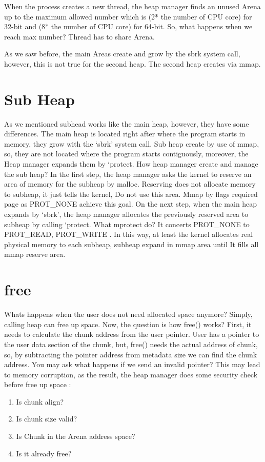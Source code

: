 \documentclass{masterthesis}
\begin{document}
When the process creates a new thread, the heap manager finds an unused Arena up to the maximum allowed number which is (2* the number of CPU core) for 32-bit and (8* the number of CPU core) for 64-bit. So, what happens when we reach max number? Thread has to share Arena.

As we saw before, the main Areas create and grow by the sbrk system call, however, this is not true for the second heap. The second heap creates via mmap.

\section{Sub Heap}
As we mentioned subhead works like the main heap, however, they have some differences. The main heap is located right after where the program starts in memory, they grow with the ‘sbrk’ system call. Sub heap create by use of mmap, so, they are not located where the program starts contiguously, moreover, the Heap manager expands them by ‘protect.
How heap manager create and manage the sub heap? In the first step, the heap manager asks the kernel to reserve an area of memory for the subheap by malloc. Reserving does not allocate memory to subheap, it just tells the kernel, Do not use this area. Mmap by flags required page as PROT\_NONE achieve this goal.
On the next step, when the main heap expands by ‘sbrk’, the heap manager allocates the previously reserved area to subheap by calling ‘protect. What mprotect do? It concerts PROT\_NONE to PROT\_READ, PROT\_WRITE . In this way, at least the kernel allocates real physical memory to each subheap, subheap expand in mmap area until It fills all mmap reserve area.

\section{free}
Whats happens when the user does not need allocated space anymore? Simply, calling heap can free up space. Now, the question is how free() works? First, it needs to calculate the chunk address from the user pointer. User has a pointer to the user data section of the chunk, but, free() needs the actual address of chunk, so, by subtracting the pointer address from metadata size we can find the chunk address. You may ask what happens if we send an invalid pointer? This may lead to memory corruption, as the result, the heap manager does some security check before free up space :

\begin{enumerate}
	\item Is chunk align? 
	\item Is chunk size valid?
	\item Is Chunk in the Arena address space?
	\item Is it already free?
\end{enumerate}
\end{document}
